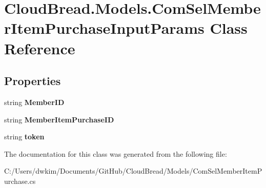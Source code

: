 \hypertarget{a00065}{}\section{Cloud\+Bread.\+Models.\+Com\+Sel\+Member\+Item\+Purchase\+Input\+Params Class Reference}
\label{a00065}
\subsection*{Properties}
\begin{DoxyCompactItemize}
\item 
string {\bfseries Member\+ID}\hypertarget{a00065_a8ca1cb044b415ec5765d7cfed1c23af5}{}\label{a00065_a8ca1cb044b415ec5765d7cfed1c23af5}

\item 
string {\bfseries Member\+Item\+Purchase\+ID}\hypertarget{a00065_a6e12e64dabb56c5ae4322dd9458ea8df}{}\label{a00065_a6e12e64dabb56c5ae4322dd9458ea8df}

\item 
string {\bfseries token}\hypertarget{a00065_acae351acbe0ebbe153ef2c8a78835dcb}{}\label{a00065_acae351acbe0ebbe153ef2c8a78835dcb}

\end{DoxyCompactItemize}


The documentation for this class was generated from the following file\+:\begin{DoxyCompactItemize}
\item 
C\+:/\+Users/dwkim/\+Documents/\+Git\+Hub/\+Cloud\+Bread/\+Models/Com\+Sel\+Member\+Item\+Purchase.\+cs\end{DoxyCompactItemize}
